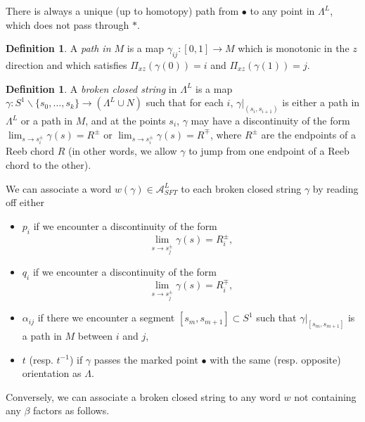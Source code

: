 \documentclass[a4paper,final, reqno]{amsart}
\theoremstyle{plain}
\theoremstyle{definition}
\newtheorem{Def}[Th]{Definition}
\renewcommand{\setminus}{\smallsetminus}
\newcommand{\A}{\mathcal{A}}
\begin{document}
	
	
	
	There is always a unique (up to homotopy) path from $\bullet$ to any point in $\Lambda^L$, which does not pass through $*$.
	
	\begin{Def}
		A \emph{path in $M$} is a map $\gamma_{ij}: [0,1] \to M$ which is monotonic in the $z$ direction and which satisfies $\Pi_{xz}(\gamma(0)) = i$ and $\Pi_{xz}(\gamma(1)) = j$.
	\end{Def}
	
	
	\begin{Def}
		A \emph{broken closed string} in $\Lambda^L$ is a map $\gamma: S^1 \setminus\{s_0,\dots, s_k\} \to (\Lambda^L \cup N)$ such that for each $i$, $\gamma|_{(s_i, s_{i+1})}$ is either a path in $\Lambda^L$ or a path in $M$, and at the points $s_i$, $\gamma$ may have a discontinuity of the form $\lim_{s\to s_i^\pm} \gamma(s) = R^\pm$ or $\lim_{s\to s_i^\pm}  \gamma(s) = R^\mp$, where $R^{\pm}$ are the endpoints of a Reeb chord $R$ (in other words, we allow $\gamma$ to jump from one endpoint of a Reeb chord to the other).
	\end{Def}
		
	We can associate a word $w(\gamma) \in \A^L_{SFT}$ to each broken closed string $\gamma$ by reading off either 
	
	\begin{itemize}
		\item $p_i$ if we encounter a discontinuity of the form 
		\[ \lim_{s\to s_j^\pm} \gamma(s) = R_i^\pm,\]
		\item $q_i$ if we encounter a discontinuity of the form
		\[ \lim_{s\to s_j^\pm} \gamma(s) = R_i^\mp, \]
		\item $\alpha_{ij}$ if there we encounter a segment $[s_m,s_{m+1}] \subset S^1$ such that $\gamma|_{[s_{m}, s_{m+1}]}$ is a path in $M$ between $i$ and $j$,
		\item $t$ (resp. $t^{-1}$) if $\gamma$ passes the marked point $\bullet$ with the same (resp. opposite) orientation as $\Lambda$.
		\-\ 
		
	\end{itemize}
	
	
	Conversely, we can associate a broken closed string to any word $w$ not containing any $\beta$ factors as follows. 
	
\end{document}
